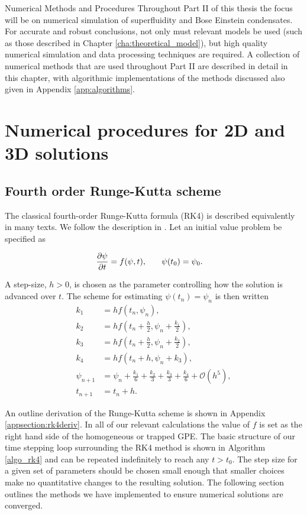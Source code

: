 \begin{chapter}{\label{cha:numerics}Numerical Methods and Procedures}
Throughout Part II of this thesis the focus will be on numerical simulation of superfluidity and Bose Einstein condensates. For accurate and robust conclusions, not only must relevant models be used (such as those described in Chapter \ref{cha:theoretical_model}), but high quality numerical simulation and data processing techniques are required. A collection of numerical methods that are used throughout Part II are described in detail in this chapter, with algorithmic implementations of the methods discussed also given in Appendix \ref{app:algorithms}.
\section{\label{section:RK} Numerical procedures for 2D and 3D solutions}
	\subsection{\label{section:RK4} Fourth order Runge-Kutta scheme}
	The classical fourth-order Runge-Kutta formula (RK4) is described equivalently in many texts. We follow the description in \cite{NumericalRecipes}. Let an initial value problem be specified as
	
	\begin{align*}
		\frac{\partial \psi}{\partial t} &= f(\psi,t),\hspace{0.25in}\psi(t_0) = \psi_0.
	\end{align*}

A step-size, $h>0$, is chosen as the parameter controlling how the solution is advanced over $t$. The scheme for estimating $\psi(t_n)= \psi_n$ is then written
\begin{equation}
\begin{split}
		k_1 &= hf(t_n,\psi_n),\\
		k_2 &= hf(t_n+\frac{h}{2},\psi_n+\frac{k_1}{2}),\\
		k_3 &= hf(t_n+\frac{h}{2},\psi_n+\frac{k_2}{2}),\\
		k_4 &= hf(t_n+h,\psi_n+k_3),\\
		\psi_{n+1} &= \psi_n + \frac{k_1}{6}+ \frac{k_2}{3}+ \frac{k_3}{3} + \frac{k_4}{6} + \mathcal{O}(h^5),\\
		t_{n+1}  &= t_n + h.
		\label{eq:rk4}
\end{split}
\end{equation}


	An outline derivation of the Runge-Kutta scheme is shown in Appendix \ref{appsection:rk4deriv}.	In all of our relevant calculations the value of $f$ is set as the right hand side of the homogeneous or trapped GPE. The basic structure of our time stepping loop surrounding the RK4 method is shown in Algorithm \ref{algo_rk4} and can be repeated indefinitely to reach any $t>t_0$. The step size for a given set of parameters should be chosen small enough that smaller choices make no quantitative changes to the resulting solution. The following section outlines the methods we have implemented to ensure numerical solutions are converged.


\end{chapter}
